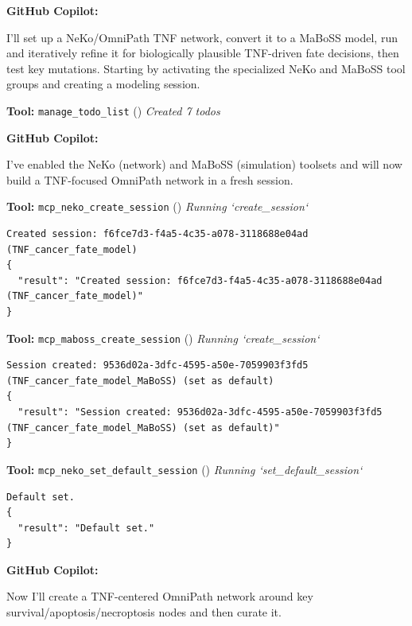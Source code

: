 \documentclass[11pt,a4paper]{article}
\begin{document}
\begin{copilotbox}
\textbf{GitHub Copilot:}

I'll set up a NeKo/OmniPath TNF network, convert it to a MaBoSS model, run and iteratively refine it for biologically plausible TNF-driven fate decisions, then test key mutations. Starting by activating the specialized NeKo and MaBoSS tool groups and creating a modeling session.

\end{copilotbox}
\begin{toolokbox}
\textbf{Tool:} \texttt{manage\_todo\_list} (\checkmark)
\textit{Created 7 todos}
\end{toolokbox}
\begin{copilotbox}
\textbf{GitHub Copilot:}

I’ve enabled the NeKo (network) and MaBoSS (simulation) toolsets and will now build a TNF-focused OmniPath network in a fresh session.

\end{copilotbox}
\begin{toolokbox}
\textbf{Tool:} \texttt{mcp\_neko\_create\_session} (\checkmark)
\textit{Running `create\_session`}
\begin{lstlisting}
Created session: f6fce7d3-f4a5-4c35-a078-3118688e04ad (TNF_cancer_fate_model)
{
  "result": "Created session: f6fce7d3-f4a5-4c35-a078-3118688e04ad (TNF_cancer_fate_model)"
}
\end{lstlisting}
\end{toolokbox}
\begin{toolokbox}
\textbf{Tool:} \texttt{mcp\_maboss\_create\_session} (\checkmark)
\textit{Running `create\_session`}
\begin{lstlisting}
Session created: 9536d02a-3dfc-4595-a50e-7059903f3fd5 (TNF_cancer_fate_model_MaBoSS) (set as default)
{
  "result": "Session created: 9536d02a-3dfc-4595-a50e-7059903f3fd5 (TNF_cancer_fate_model_MaBoSS) (set as default)"
}
\end{lstlisting}
\end{toolokbox}
\begin{toolokbox}
\textbf{Tool:} \texttt{mcp\_neko\_set\_default\_session} (\checkmark)
\textit{Running `set\_default\_session`}
\begin{lstlisting}
Default set.
{
  "result": "Default set."
}
\end{lstlisting}
\end{toolokbox}
\begin{copilotbox}
\textbf{GitHub Copilot:}

Now I'll create a TNF-centered OmniPath network around key survival/apoptosis/necroptosis nodes and then curate it.

\end{copilotbox}
\end{document}
